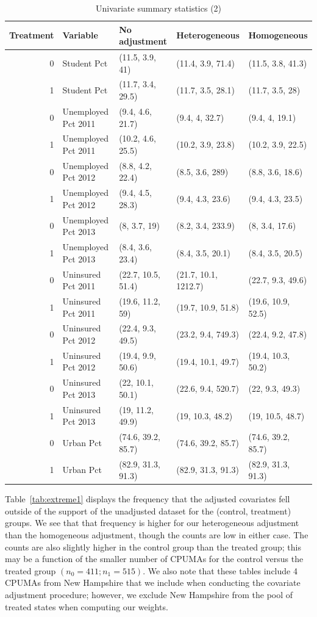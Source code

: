 \begin{table}[ht]
\centering
    \caption{Univariate summary statistics (2)}
    \label{tab:summarytab2}
\begin{tabular}{rllll}
  \hline
Treatment & Variable & No adjustment & Heterogeneous & Homogeneous \\ 
  \hline
  0 & Student Pct & (11.5, 3.9, 41) & (11.4, 3.9, 71.4) & (11.5, 3.8, 41.3) \\ 
  1 & Student Pct & (11.7, 3.4, 29.5) & (11.7, 3.5, 28.1) & (11.7, 3.5, 28) \\ 
  0 & Unemployed Pct 2011 & (9.4, 4.6, 21.7) & (9.4, 4, 32.7) & (9.4, 4, 19.1) \\ 
  1 & Unemployed Pct 2011 & (10.2, 4.6, 25.5) & (10.2, 3.9, 23.8) & (10.2, 3.9, 22.5) \\ 
  0 & Unemployed Pct 2012 & (8.8, 4.2, 22.4) & (8.5, 3.6, 289) & (8.8, 3.6, 18.6) \\ 
  1 & Unemployed Pct 2012 & (9.4, 4.5, 28.3) & (9.4, 4.3, 23.6) & (9.4, 4.3, 23.5) \\ 
  0 & Unemployed Pct 2013 & (8, 3.7, 19) & (8.2, 3.4, 233.9) & (8, 3.4, 17.6) \\ 
  1 & Unemployed Pct 2013 & (8.4, 3.6, 23.4) & (8.4, 3.5, 20.1) & (8.4, 3.5, 20.5) \\ 
  0 & Uninsured Pct 2011 & (22.7, 10.5, 51.4) & (21.7, 10.1, 1212.7) & (22.7, 9.3, 49.6) \\ 
  1 & Uninsured Pct 2011 & (19.6, 11.2, 59) & (19.7, 10.9, 51.8) & (19.6, 10.9, 52.5) \\ 
  0 & Uninsured Pct 2012 & (22.4, 9.3, 49.5) & (23.2, 9.4, 749.3) & (22.4, 9.2, 47.8) \\ 
  1 & Uninsured Pct 2012 & (19.4, 9.9, 50.6) & (19.4, 10.1, 49.7) & (19.4, 10.3, 50.2) \\ 
  0 & Uninsured Pct 2013 & (22, 10.1, 50.1) & (22.6, 9.4, 520.7) & (22, 9.3, 49.3) \\ 
  1 & Uninsured Pct 2013 & (19, 11.2, 49.9) & (19, 10.3, 48.2) & (19, 10.5, 48.7) \\ 
  0 & Urban Pct & (74.6, 39.2, 85.7) & (74.6, 39.2, 85.7) & (74.6, 39.2, 85.7) \\ 
  1 & Urban Pct & (82.9, 31.3, 91.3) & (82.9, 31.3, 91.3) & (82.9, 31.3, 91.3) \\ 
  \hline
\end{tabular}
\end{table}

Table~\ref{tab:extreme1} displays the frequency that the adjusted covariates fell outside of the support of the unadjusted dataset for the (control, treatment) groups. We see that that frequency is higher for our heterogeneous adjustment than the homogeneous adjustment, though the counts are low in either case. The counts are also slightly higher in the control group than the treated group; this may be a function of the smaller number of CPUMAs for the control versus the treated group $(n_0 = 411; n_1 = 515)$. We also note that these tables include 4 CPUMAs from New Hampshire that we include when conducting the covariate adjustment procedure; however, we exclude New Hampshire from the pool of treated states when computing our weights.

